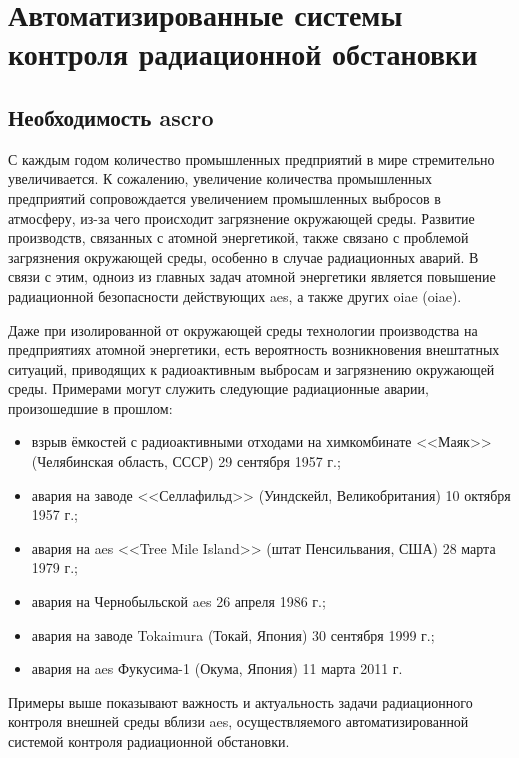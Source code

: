 \chapter{Автоматизированные системы контроля радиационной обстановки}


\section{Необходимость \ac{ascro}}

С каждым годом количество промышленных предприятий в мире стремительно увеличивается. К сожалению, увеличение количества 
промышленных предприятий сопровождается увеличением промышленных выбросов в атмосферу, из-за чего происходит загрязнение 
окружающей среды. Развитие производств, связанных с атомной энергетикой, также связано с проблемой загрязнения 
окружающей среды, особенно в случае радиационных аварий. В связи с этим, одноиз из главных задач атомной энергетики 
является повышение радиационной безопасности действующих \ac{aes}, а также других \ac{oiae} 
(\acl{oiae}).

Даже при изолированной от окружающей среды технологии производства на предприятиях атомной энергетики, есть вероятность 
возникновения внештатных ситуаций, приводящих к радиоактивным выбросам и загрязнению окружающей среды. Примерами могут 
служить следующие радиационные аварии, произошедшие в прошлом:

\begin{itemize}
	\item взрыв ёмкостей с радиоактивными отходами на химкомбинате <<Маяк>> (Челябинская область, СССР) 29 сентября 
		1957 г.;
	\item авария на заводе <<Селлафильд>> (Уиндскейл, Великобритания) 10 октября 1957 г.;
	\item авария на \ac{aes} <<Tree Mile Island>> (штат Пенсильвания, США) 28 марта 1979 г.;
	\item авария на Чернобыльской \ac{aes} 26 апреля 1986 г.;
	\item авария на заводе Tokaimura (Токай, Япония) 30 сентября 1999 г.;
	\item авария на \ac{aes} Фукусима-1 (Окума, Япония) 11 марта 2011 г.
\end{itemize}

Примеры выше показывают важность и актуальность задачи радиационного контроля внешней среды вблизи \ac{aes}, 
осуществляемого автоматизированной системой контроля радиационной обстановки. 

